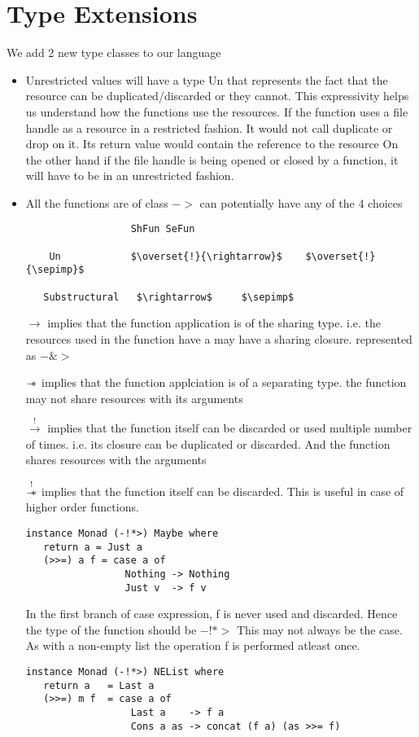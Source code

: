 \chapter{Type Extensions}

We add 2 new type classes to our language
\begin{itemize}
\item Unrestricted values will have a type Un
  that represents the fact that the resource can be
  duplicated/discarded or they cannot.
  This expressivity helps us understand how the functions
  use the resources. If the function uses a file handle as a resource
  in a restricted fashion. It would not call duplicate or drop on it.
  Its return value would contain the reference to the resource
  On the other hand if the file handle is being opened or closed
  by a function, it will have to be in an unrestricted fashion.
\item All the functions are of class $->$ can potentially have any of the 4 choices
  \begin{lstlisting}
                  ShFun SeFun

    Un            $\overset{!}{\rightarrow}$    $\overset{!}{\sepimp}$

   Substructural   $\rightarrow$     $\sepimp$
  \end{lstlisting}

  $\rightarrow$ implies that the function application is of the sharing type.
  i.e. the resources used in the function have a may have a sharing closure.
  represented as $-\&>$

  $\mathrel{-\mkern-6mu*}$ implies that the function applciation is of a separating type.
  the function may not share resources with its arguments

  $\overset{!}{\rightarrow}$ implies that the function itself can be discarded
  or used multiple number of times. i.e. its closure
  can be duplicated or discarded. And the function shares resources with the arguments

  $\overset{!}{\mathrel{-\mkern-6mu*}}$ implies that the function itself can be discarded.
  This is useful in case of higher order functions. 

\begin{verbatim}
instance Monad (-!*>) Maybe where
   return a = Just a
   (>>=) a f = case a of
                 Nothing -> Nothing
                 Just v  -> f v
\end{verbatim}

  In the first branch of case expression, f is never used and discarded. Hence
  the type of the function should be $-!*>$
  This may not always be the case. As with a non-empty list
  the operation f is performed atleast once.

\begin{verbatim}
instance Monad (-!*>) NEList where
   return a   = Last a
   (>>=) m f  = case a of
                  Last a    -> f a
                  Cons a as -> concat (f a) (as >>= f)
\end{verbatim}

\end{itemize}


